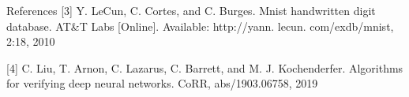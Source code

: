 \documentclass[final]{beamer}
\begin{document}
\begin{frame}[fragile]{}
\begin{textblock}{\colwidth}
\begin{paddedBlock}{References}
\footnotesize{[3] Y. LeCun, C. Cortes, and C. Burges. Mnist handwritten digit database. AT&T Labs [Online]. Available: http://yann. lecun. com/exdb/mnist, 2:18, 2010}

\footnotesize{[4] C. Liu, T. Arnon, C. Lazarus, C. Barrett, and M. J. Kochenderfer. Algorithms for verifying deep neural networks. CoRR, abs/1903.06758, 2019}

\end{paddedBlock}
\end{textblock}






\end{frame}
\end{document}

